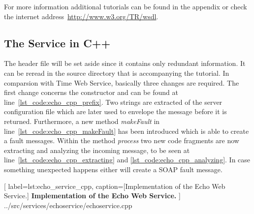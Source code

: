 For more information additional tutorials can be found in the appendix or check the internet address~\href{http://www.w3.org/TR/wsdl}{http://www.w3.org/TR/wsdl}.







\subsection{The Service in C++}

The header file will be set aside since it contains only redundant information. 
It can be reread in the source directory that is accompanying the tutorial.
In comparsion with Time Web Service, basically three changes are required.
The first change concerns the constructor and can be found at line~\ref{lst_code:echo_cpp_prefix}.
Two strings are extracted of the server configuration file which are later used to envelope the message before it is returned.
Furthermore, a new method \textit{makeFault} in line~\ref{lst_code:echo_cpp_makeFault} has been introduced which is able to create a fault messages.
Within the method \textit{process} two new code fragments are now extracting and analyzing the incoming message, to be seen at line~\ref{lst_code:echo_cpp_extracting} and \ref{lst_code:echo_cpp_analyzing}.
In case something unexpected happens either will create a SOAP fault message.\\


	[
	label=lst:echo_service_cpp,
	caption={[Implementation of the Echo Web Service.]
	\textbf{Implementation of the Echo Web Service.}}
	]
{../src/services/echoservice/echoservice.cpp}



